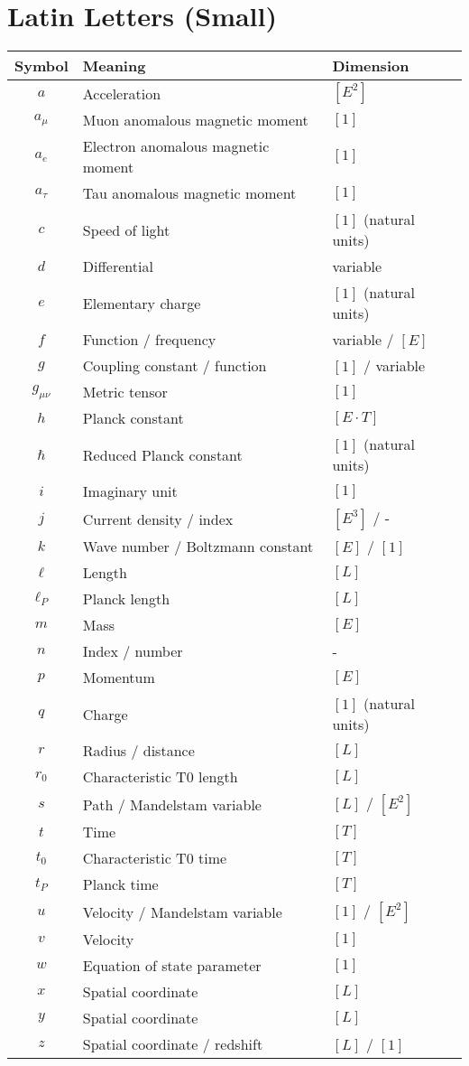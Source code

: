 \documentclass[12pt,a4paper]{report}
\begin{document}
\section{Latin Letters (Small)}
\label{sec:latin_small}

\begin{longtable}{|c|l|l|}
	\hline
	\textbf{Symbol} & \textbf{Meaning} & \textbf{Dimension} \\
	\hline
	$a$ & Acceleration & $[E^2]$ \\
	$a_\mu$ & Muon anomalous magnetic moment & $[1]$ \\
	$a_e$ & Electron anomalous magnetic moment & $[1]$ \\
	$a_\tau$ & Tau anomalous magnetic moment & $[1]$ \\
	$c$ & Speed of light & $[1]$ (natural units) \\
	$d$ & Differential & variable \\
	$e$ & Elementary charge & $[1]$ (natural units) \\
	$f$ & Function / frequency & variable / $[E]$ \\
	$g$ & Coupling constant / function & $[1]$ / variable \\
	$g_{\mu\nu}$ & Metric tensor & $[1]$ \\
	$h$ & Planck constant & $[E \cdot T]$ \\
	$\hbar$ & Reduced Planck constant & $[1]$ (natural units) \\
	$i$ & Imaginary unit & $[1]$ \\
	$j$ & Current density / index & $[E^3]$ / - \\
	$k$ & Wave number / Boltzmann constant & $[E]$ / $[1]$ \\
	$\ell$ & Length & $[L]$ \\
	$\ell_P$ & Planck length & $[L]$ \\
	$m$ & Mass & $[E]$ \\
	$n$ & Index / number & - \\
	$p$ & Momentum & $[E]$ \\
	$q$ & Charge & $[1]$ (natural units) \\
	$r$ & Radius / distance & $[L]$ \\
	$r_0$ & Characteristic T0 length & $[L]$ \\
	$s$ & Path / Mandelstam variable & $[L]$ / $[E^2]$ \\
	$t$ & Time & $[T]$ \\
	$t_0$ & Characteristic T0 time & $[T]$ \\
	$t_P$ & Planck time & $[T]$ \\
	$u$ & Velocity / Mandelstam variable & $[1]$ / $[E^2]$ \\
	$v$ & Velocity & $[1]$ \\
	$w$ & Equation of state parameter & $[1]$ \\
	$x$ & Spatial coordinate & $[L]$ \\
	$y$ & Spatial coordinate & $[L]$ \\
	$z$ & Spatial coordinate / redshift & $[L]$ / $[1]$ \\
	\hline
\end{longtable}
\end{document}
